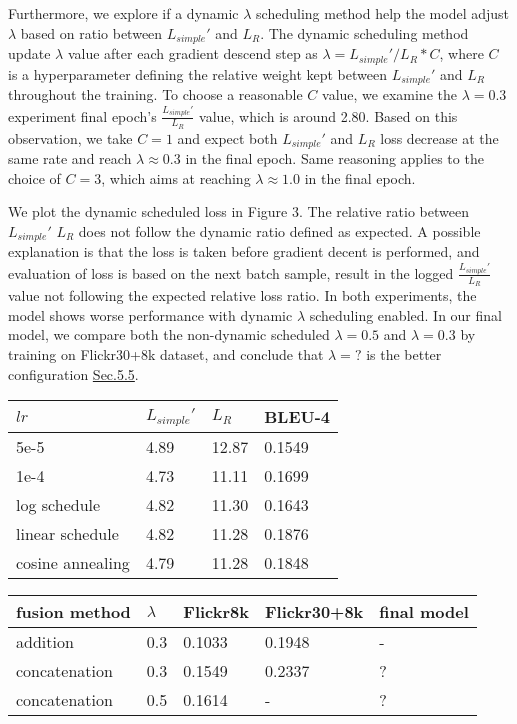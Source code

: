 \documentclass{article}
\begin{document}
Furthermore, we explore if a dynamic $\lambda$ scheduling method help the model adjust $\lambda$ based on ratio between $L_{simple}'$ and $L_R$. The dynamic scheduling method update $\lambda$ value after each gradient descend step as $\lambda = L_{simple}' / L_R * C$, where $C$ is a hyperparameter defining the relative weight kept between $L_{simple}'$ and $L_R$ throughout the training. To choose a reasonable $C$ value, we examine the $\lambda = 0.3$ experiment final epoch's $\frac{L_{simple}'}{L_R}$ value, which is around 2.80. Based on this observation, we take $C = 1$ and expect both $L_{simple}'$ and $L_R$ loss decrease at the same rate and reach $\lambda \approx 0.3$ in the final epoch. Same reasoning applies to the choice of $C = 3$, which aims at reaching $\lambda \approx 1.0$ in the final epoch. 

We plot the dynamic scheduled loss in Figure 3. The relative ratio between $L_{simple}'$ $L_R$ does not follow the dynamic ratio defined as expected. A possible explanation is that the loss is taken before gradient decent is performed, and evaluation of loss is based on the next batch sample, result in the logged $\frac{L_{simple}'}{L_R}$ value not following the expected relative loss ratio. In both experiments, the model shows worse performance with dynamic $\lambda$ scheduling enabled. In our final model, we compare both the non-dynamic scheduled $\lambda = 0.5$ and $\lambda = 0.3$ by training on Flickr30+8k dataset, and conclude that $\lambda = ?$ is the better configuration \hyperref[sec:CLIP-DiffuseLM]{Sec.5.5}.

\begin{minipage}[c]{0.5\textwidth}
\centering
\begin{tabular}{llll}
\toprule
$lr$ & $L_{simple}'$ & $L_R$ & BLEU-4 \\
\midrule
5e-5 & 4.89 & 12.87 & 0.1549 \\
1e-4 & 4.73 & 11.11 & 0.1699  \\
log schedule & 4.82 & 11.30 & 0.1643 \\
linear schedule & 4.82 & 11.28 & 0.1876 \\
cosine annealing & 4.79 & 11.28 & 0.1848
\bottomrule
\end{tabular}
\label{tab:lr}
\end{minipage}
\begin{minipage}[c]{0.5\textwidth}
\centering
\begin{tabular}{lllll}
\toprule
fusion method & $\lambda$ & Flickr8k & Flickr30+8k & final model \\
\midrule
addition & 0.3 & 0.1033 & 0.1948 & - \\
concatenation & 0.3 & 0.1549 & 0.2337 & ? \\
concatenation & 0.5 & 0.1614 & - & ? 
\bottomrule
\end{tabular}
\label{tab:fusion}
\end{minipage}
\end{document}
